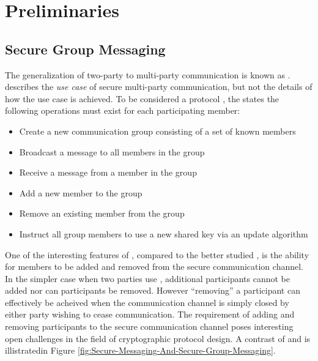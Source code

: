 \hypertarget{sec:preliminaries}{%
\chapter{Preliminaries}\label{sec:preliminaries}}

\hypertarget{sec:secure-group-messaging}{%
\section{Secure Group Messaging}\label{sec:secure-group-messaging}}

The generalization of two-party  to multi-party communication is known as  \autocite{cohn2018ends}.
 describes the \emph{use case} of secure multi-party communication, but not the details of how the use case is achieved.
To be considered a  protocol \autocite{ietf-mls-protocol-14}, the  states the following operations must exist for each participating member: 

\begin{itemize}
\item Create a new communication group consisting of a set of known members
\item Broadcast a message to all members in the group
\item Receive a message from a member in the group
\item Add a new member to the group
\item Remove an existing member from the group
\item Instruct all group members to use a new shared key via an update algorithm
\end{itemize}

One of the interesting features of , compared to the better studied , is the ability for members to be added and removed from the secure communication channel.
In the simpler case when two parties use , additional participants cannot be added nor can participants be removed.
However ``removing'' a participant can effectively be acheived when the communication channel is simply closed by either party wishing to cease communication.
The  requirement of adding and removing participants to the secure communication channel poses interesting open challenges in the field of cryptographic protocol design.
A contrast of  and  is illistratedin Figure \ref{fig:Secure-Messaging-And-Secure-Group-Messaging}.

